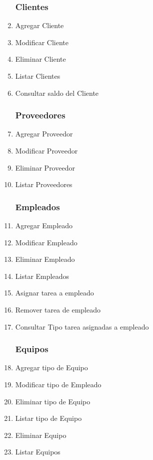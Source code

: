 \documentclass[12pt]{extarticle}
\begin{document}
\begin{spacing}{1.2}
\begin{multicols}{2}
\begin{enumerate}
        \subsubsection*{Clientes}
            \item Agregar Cliente
            \item Modificar Cliente
            \item Eliminar Cliente
            \item Listar Clientes
            \item Consultar saldo del Cliente
        \subsubsection*{Proveedores}
            \item Agregar Proveedor
            \item Modificar Proveedor
            \item Eliminar Proveedor
            \item Listar Proveedores	
        \subsubsection*{Empleados}
            \item Agregar Empleado
            \item Modificar Empleado
            \item Eliminar Empleado
            \item Listar Empleados	
            \item Asignar tarea a empleado
            \item Remover tarea de empleado
            \item Consultar Tipo tarea asignadas a empleado
        \subsubsection*{Equipos}
            \item Agregar tipo de Equipo
            \item Modificar tipo de Empleado
            \item Eliminar tipo de Equipo
            \item Listar tipo de Equipo
            \item Eliminar Equipo
            \item Listar Equipos

\end{enumerate}
\end{multicols}
\end{spacing}
\end{document}
